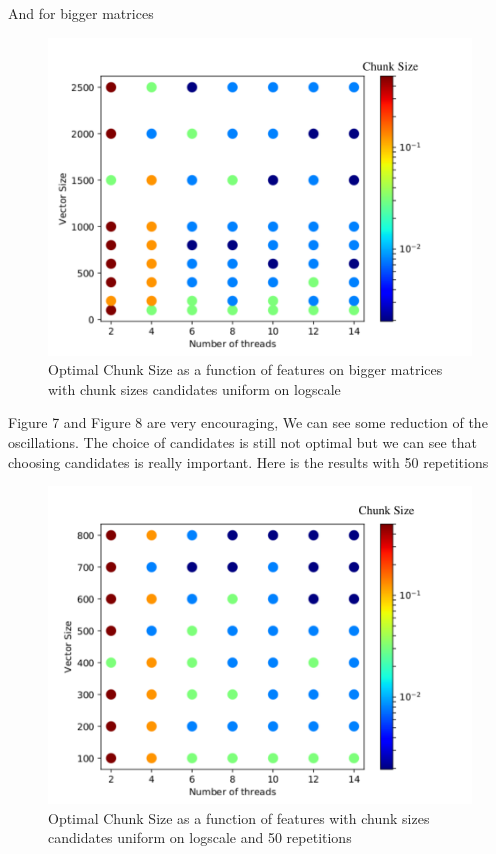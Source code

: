 And for bigger matrices
\begin{figure}[H]
	\centering
	\includegraphics[width=120mm]{images/chunk_size_function_matrix_uniform_log_big.pdf}
	\caption{Optimal Chunk Size as a function of features on bigger matrices with chunk sizes candidates uniform on logscale }
\end{figure}

Figure 7 and Figure 8 are very encouraging, We can see some reduction of the oscillations. The choice of candidates is still not optimal but we can see that choosing candidates is really important. Here is the results with 50 repetitions

\begin{figure}[H]
	\centering
	\includegraphics[width=120mm]{images/chunk_size_function_matrix_uniform_log_50rep.pdf}
	\caption{Optimal Chunk Size as a function of features with chunk sizes candidates uniform on logscale and 50 repetitions}
\end{figure}

